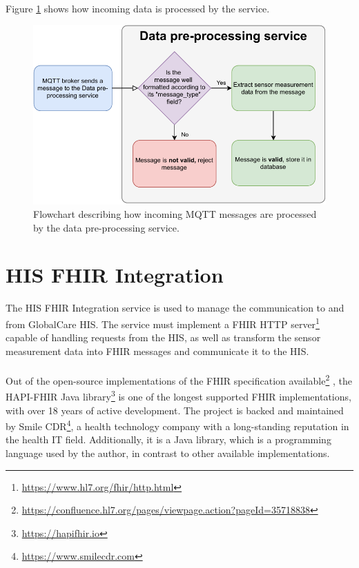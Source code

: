 \paragraph{} Figure \ref{fig:dataprocess_flowdiagram} shows how incoming data is processed by the service. 

\begin{figure}[H]
    \centering
    \includegraphics[width=\linewidth]{images/data pre processing.pdf}
    \caption[Flowchart describing how incoming \acs{MQTT} messages are processed by the data pre-processing service.]{Flowchart describing how incoming \acs{MQTT} messages are processed by the data pre-processing service.}
    \label{fig:dataprocess_flowdiagram}
\end{figure}

\section{\acs{HIS} \acs{FHIR} Integration}
The \acs{HIS} \acs{FHIR} Integration service is used to manage the communication to and from GlobalCare \acs{HIS}. The service must implement a \acs{FHIR} \acs{HTTP} server\footnote{\url{https://www.hl7.org/fhir/http.html}} capable of handling requests from the \acs{HIS}, as well as transform the sensor measurement data into \acs{FHIR} messages and communicate it to the \acs{HIS}.

\paragraph{} Out of the open-source implementations of the \acs{FHIR} specification available\footnote{\url{https://confluence.hl7.org/pages/viewpage.action?pageId=35718838}}
, the HAPI-FHIR Java library\footnote{\url{https://hapifhir.io}} is one of the longest supported \acs{FHIR} implementations, with over 18 years of active development. The project is backed and maintained by Smile CDR\footnote{\url{https://www.smilecdr.com}}, a health technology company with a long-standing reputation in the health \acs{IT} field. Additionally, it is a Java library, which is a programming language used by the author, in contrast to other available implementations.

